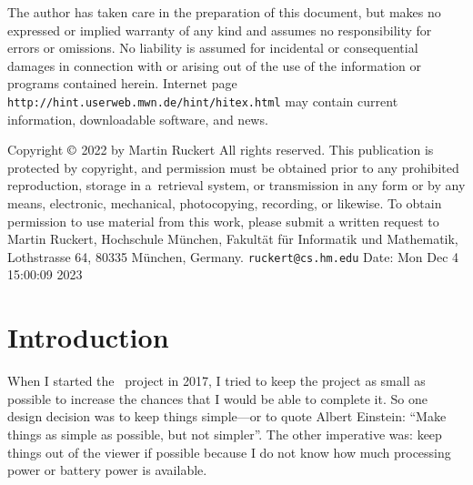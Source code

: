 {\raggedright\advance\rightskip 3.5pc 
The author has taken care in the preparation of this document,
but makes no expressed or implied warranty of any kind and assumes no
responsibility for errors or omissions. No liability is assumed for
incidental or consequential damages in connection with or arising out
of the use of the information or programs contained herein.
\bigskip
{\def\:{\discretionary{}{}{}}
Internet page  {\tt http:\://hint.\:userweb.\:mwn.\:de/\:hint/hitex.html}
may contain current information, downloadable software,
and news.}

\vfill
Copyright $\copyright$ 2022 by Martin Ruckert
\smallskip
All rights reserved.
\smallskip
This publication is protected by copyright, and permission must be
obtained prior to any prohibited reproduction, storage in
a~retrieval system, or transmission in any form or by any means, electronic,
mechanical, photocopying, recording, or likewise.
To obtain permission to use material from this work, please submit a written
request to Martin Ruckert,
Hochschule M\"unchen,
Fakult\"at f\"ur Informatik und Mathematik,
Lothstrasse 64,
80335 M\"unchen,
Germany.
\medskip
{\tt ruckert\:@cs.hm.edu}
\medskip
\def\lastrevision{Date: Mon Dec 4 15:00:09 2023}
\lastrevision\par
}
\eject
\endgroup

\frontmatter
{}%

\tableofcontent

\mainmatter

\def\rs{\hskip 2pt plus 3pt minus 2pt\penalty0\relax}
\def\rule#1:#2.{\par{\hangindent32pt\hangafter1\parindent0pt\rightskip 0pt plus 60pt#1{\bf:}\quad%
  \hskip 0pt plus 60pt\penalty-300\hskip 0pt plus -60pt#2{\bf.}\par}}
\def\sym#1{\rs$<${\it #1\/}$>$\rs}
\def\OR{\rs${}\vert{}$\rs}
\def\opt#1{\rs$[{}$#1${}]$\rs}
\def\ctl#1{{\tt\BS #1}}

\section{Introduction}
When I started the \HINT\ project in 2017,
I tried to keep the project as small as possible to increase the
chances that I would be able to complete it. So one design decision
was to keep things simple---or to quote Albert Einstein: ``Make things 
as simple as possible, but not simpler''. The other imperative was:
keep things out of the viewer if possible because I do not know
how much processing power or battery power is available.

